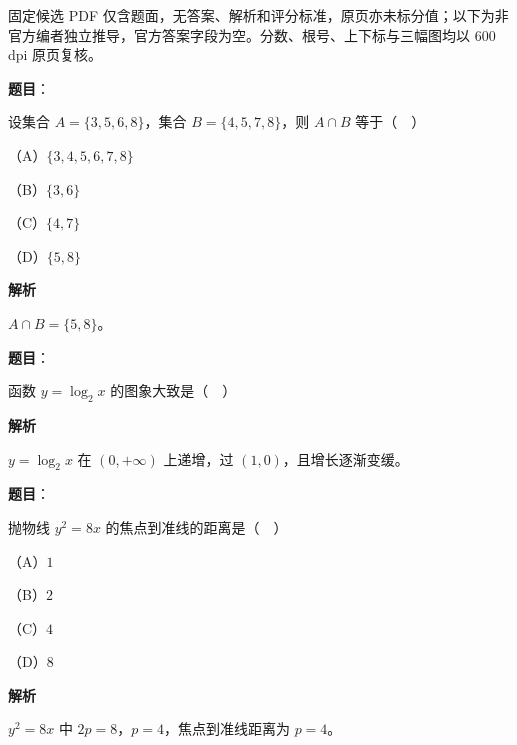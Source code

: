 

\begin{gktip}
固定候选 PDF 仅含题面，无答案、解析和评分标准，原页亦未标分值；以下为非官方编者独立推导，官方答案字段为空。分数、根号、上下标与三幅图均以 600 dpi 原页复核。
\end{gktip}

\begin{answer}

\textbf{题目}：

设集合 $A=\{3,5,6,8\}$，集合 $B=\{4,5,7,8\}$，则 $A\cap B$ 等于（　）

（A）$\{3,4,5,6,7,8\}$

（B）$\{3,6\}$

（C）$\{4,7\}$

（D）$\{5,8\}$

\textbf{解析}

$A\cap B=\{5,8\}$。


\end{answer}
\begin{answer}

\textbf{题目}：

函数 $y=\log_2x$ 的图象大致是（　）
\nopagebreak[4]
\begin{center}\end{center}
\nopagebreak[4]
\textbf{解析}

$y=\log_2x$ 在 $(0,+\infty)$ 上递增，过 $(1,0)$，且增长逐渐变缓。


\end{answer}
\begin{answer}

\textbf{题目}：

抛物线 $y^2=8x$ 的焦点到准线的距离是（　）

（A）$1$

（B）$2$

（C）$4$

（D）$8$

\textbf{解析}

$y^2=8x$ 中 $2p=8$，$p=4$，焦点到准线距离为 $p=4$。


\end{answer}
